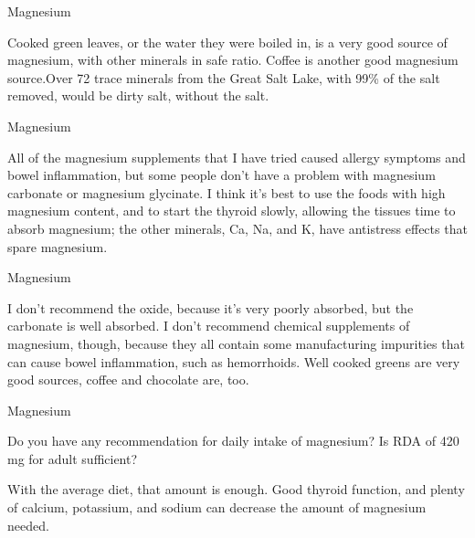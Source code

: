 \documentclass[11pt,oneside,openany,extrafontsizes]{memoir}
\begin{document}
\begin{standalonequote}{Magnesium}

    \begin{answer}
        Cooked green leaves, or the water they were boiled in, is a very good source of magnesium, with other minerals in safe ratio. Coffee is another good magnesium source.Over 72 trace minerals from the Great Salt Lake, with 99\% of the salt removed, would be dirty salt, without the salt.
    \end{answer}
\end{standalonequote}

\begin{standalonequote}{Magnesium}

    \begin{answer}
        All of the magnesium supplements that I have tried caused allergy symptoms and bowel inflammation, but some people don't have a problem with magnesium carbonate or magnesium glycinate. I think it's best to use the foods with high magnesium content, and to start the thyroid slowly, allowing the tissues time to absorb magnesium; the other minerals, Ca, Na, and K, have antistress effects that spare magnesium.
    \end{answer}
\end{standalonequote}

\begin{standalonequote}{Magnesium}

    \begin{answer}
        I don't recommend the oxide, because it's very poorly absorbed, but the carbonate is well absorbed. I don't recommend chemical supplements of magnesium, though, because they all contain some manufacturing impurities that can cause bowel inflammation, such as hemorrhoids. Well cooked greens are very good sources, coffee and chocolate are, too.
    \end{answer}
\end{standalonequote}

\begin{qaexchange}{Magnesium}

    \begin{question}
        Do you have any recommendation for daily intake of magnesium? Is RDA of 420 mg for adult sufficient?
    \end{question}

    \begin{answer}
        With the average diet, that amount is enough. Good thyroid function, and plenty of calcium, potassium, and sodium can decrease the amount of magnesium needed.
    \end{answer}
\end{qaexchange}
\end{document}
